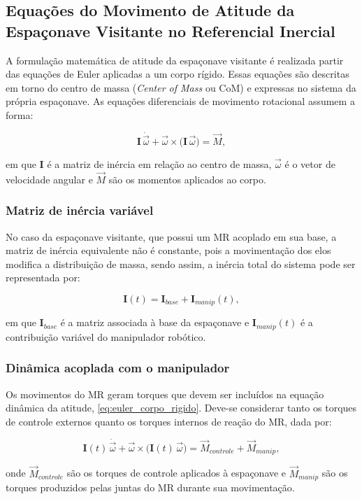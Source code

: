 \subsection{Equações do Movimento de Atitude da Espaçonave Visitante no Referencial Inercial}
\label{sec:atitude_inercial}

A formulação matemática de atitude da espaçonave visitante é realizada partir das equações de Euler aplicadas a um corpo rígido.
Essas equações são descritas em torno do centro de massa (\emph{Center of Mass} ou CoM) e expressas no sistema da própria espaçonave.
As equações diferenciais de movimento rotacional assumem a forma:

\begin{equation}
\mathbf{I}\,\dot{\vec{\omega}}
+ \vec{\omega}\times \big(\mathbf{I}\,\vec{\omega}\big)
= \vec{M},
\label{eq:euler_corpo_rigido}
\end{equation}

em que $\mathbf{I}$ é a matriz de inércia em relação ao centro de massa, $\vec{\omega}$ é o vetor de velocidade angular e $\vec{M}$ são os momentos aplicados ao corpo.

\subsubsection{Matriz de inércia variável}

No caso da espaçonave visitante, que possui um MR acoplado em sua base, a matriz de inércia equivalente não é constante, pois a movimentação dos elos modifica a distribuição de massa, sendo assim, a inércia total do sistema pode ser representada por:

\begin{equation}
\mathbf{I}(t) = \mathbf{I}_{base} + \mathbf{I}_{manip}(t),
\label{eq:inercia_total}
\end{equation}

em que $\mathbf{I}_{base}$ é a matriz associada à base da espaçonave e $\mathbf{I}_{manip}(t)$ é a contribuição variável do manipulador robótico.

\subsubsection{Dinâmica acoplada com o manipulador}

Os movimentos do MR geram torques que devem ser incluídos na equação dinâmica da atitude, \eqref{eq:euler_corpo_rigido}.
Deve-se considerar tanto os torques de controle externos quanto os torques internos de reação do MR, dada por:

\begin{equation}
\mathbf{I}(t)\,\dot{\vec{\omega}}
+ \vec{\omega}\times \big(\mathbf{I}(t)\,\vec{\omega}\big) 
= \vec{M}_{controle} + \vec{M}_{manip},
\label{eq:dinamica_acoplada}
\end{equation}

onde $\vec{M}_{controle}$ são os torques de controle aplicados à espaçonave e $\vec{M}_{manip}$ são os torques produzidos pelas juntas do MR durante sua movimentação. 
